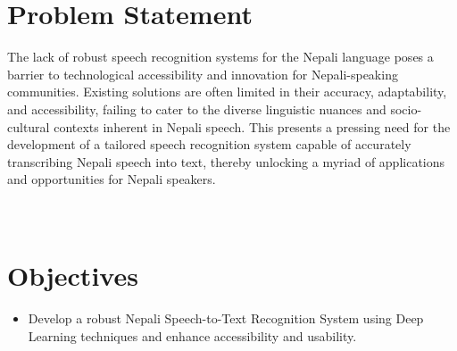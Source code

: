 	



\section{Problem Statement}
The lack of robust speech recognition systems for the Nepali language poses a barrier to technological accessibility and innovation for Nepali-speaking communities. Existing solutions are often limited in their accuracy, adaptability, and accessibility, failing to cater to the diverse linguistic nuances and socio-cultural contexts inherent in Nepali speech. This presents a pressing need for the development of a tailored speech recognition system capable of accurately transcribing Nepali speech into text, thereby unlocking a myriad of applications and opportunities for Nepali speakers.
\\ \\ 
\\
\section{Objectives}




\begin{itemize}
	\item Develop a robust Nepali Speech-to-Text Recognition System using Deep Learning techniques and enhance accessibility and usability.  
	
\end{itemize}

